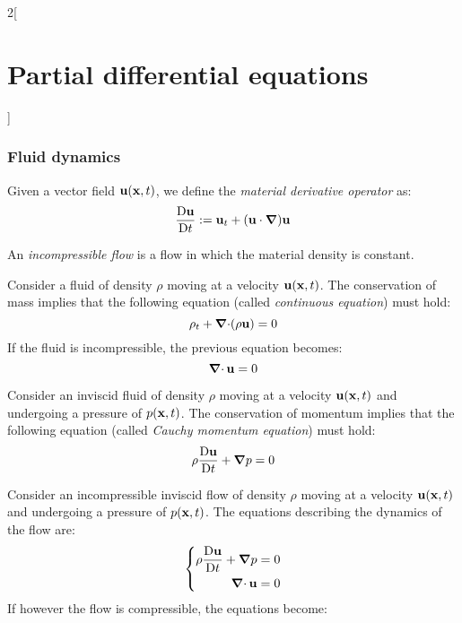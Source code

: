 \documentclass[../../../main_math.tex]{subfiles}
\begin{document}
\begin{multicols}{2}[\section{Partial differential equations}]
  \subsubsection{Fluid dynamics}
  \begin{definition}
    Given a vector field $\boldsymbol{\mathrm{u}}(\boldsymbol{\mathrm{x}},t)$, we define the \emph{material derivative operator} as: $$\frac{\mathrm{D}\boldsymbol{\mathrm{u}}}{\mathrm{D}t}:=\boldsymbol{\mathrm{u}}_t+(\boldsymbol{\mathrm{u}}\cdot\grad)\boldsymbol{\mathrm{u}}$$
  \end{definition}
  \begin{definition}
    An \emph{incompressible flow} is a flow in which the material density is constant.
  \end{definition}
  \begin{proposition}
    Consider a fluid of density $\rho$ moving at a velocity $\boldsymbol{\mathrm{u}}(\boldsymbol{\mathrm{x}},t)$. The conservation of mass implies that the following equation (called \emph{continuous equation}) must hold:
    \begin{equation}\label{PDE:continuous}
      \rho_t+\operatorname{\boldsymbol{\mathrm{\nabla}}\cdot}(\rho\boldsymbol{\mathrm{u}})=0
    \end{equation}
    If the fluid is incompressible, the previous equation becomes: $$\operatorname{\boldsymbol{\mathrm{\nabla}}\cdot}{\boldsymbol{\mathrm{u}}}=0$$
  \end{proposition}
  \begin{proposition}
    Consider an inviscid fluid of density $\rho$ moving at a velocity $\boldsymbol{\mathrm{u}}(\boldsymbol{\mathrm{x}},t)$ and undergoing a pressure of $p(\boldsymbol{\mathrm{x}},t)$. The conservation of momentum implies that the following equation (called \emph{Cauchy momentum equation}) must hold:
    \begin{equation}\label{PDE:cauchy}
      \rho\frac{\mathrm{D}\boldsymbol{\mathrm{u}}}{\mathrm{D}t}+\grad p=0
    \end{equation}
  \end{proposition}
  \begin{theorem}
    Consider an incompressible inviscid flow of density $\rho$ moving at a velocity $\boldsymbol{\mathrm{u}}(\boldsymbol{\mathrm{x}},t)$ and undergoing a pressure of $p(\boldsymbol{\mathrm{x}},t)$. The equations describing the dynamics of the flow are:
    \begin{equation*}
      \left\{
      \begin{aligned}
        \rho\frac{\mathrm{D}\boldsymbol{\mathrm{u}}}{\mathrm{D}t}+\grad p & =0 \\
        \operatorname{\boldsymbol{\mathrm{\nabla}}\cdot}{\boldsymbol{\mathrm{u}}}                 & =0
      \end{aligned}
      \right.
    \end{equation*}
    If however the flow is compressible, the equations become:
    \begin{equation*}

\end{equation*}
\end{theorem}
\end{multicols}
\end{document}
